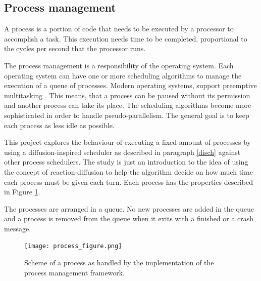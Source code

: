     \subsection{Process management}

A process is a portion of code that needs to be executed by a processor to accomplish a task. This execution needs time to be completed, proportional to the cycles per second that the processor runs.

The process management is a responsibility of the operating system. Each operating system can have one or more scheduling algorithms to manage the execution of a queue of processes. Modern operating systems, support preemptive multitasking \cite{tanenbaum_modern_2007}. This means, that a process can be paused without its permission and another process can take its place. The scheduling algorithms become more sophisticated in order to handle pseudo-parallelism. The general goal is to keep each process as less idle as possible.

This project explores the behaviour of executing a fixed amount of processes by using a diffusion-inspired scheduler as described in paragraph \ref{disch} 
against other process schedulers. The study is just an introduction to the idea of using the concept of reaction-diffusion to help the algorithm decide on how much time each process must be given each turn.
Each process has the properties described in Figure \ref{processfigure}. 

The processes are arranged in a queue. No new processes are added in the queue and a process is removed from the queue when it exits with a finished or a crash message.
\begin{figure}
\centering
\texttt{[image: process\_figure.png]}
\caption{Scheme of a process as handled by the implementation of the process management framework.}
\label{processfigure}
\end{figure}


